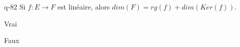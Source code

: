 \begin{truefalse}{q-82}
Si $f : E \to F$ est linéaire, alors $dim(F)=rg(f)+dim(Ker(f))$.
\item Vrai
\item* Faux
\end{truefalse}

